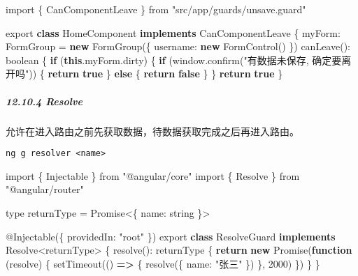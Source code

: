 \documentclass[
]{article}
\newenvironment{Shaded}{}{}
\newcommand{\AttributeTok}[1]{\textcolor[rgb]{0.49,0.56,0.16}{#1}}
\newcommand{\BuiltInTok}[1]{#1}
\newcommand{\ControlFlowTok}[1]{\textcolor[rgb]{0.00,0.44,0.13}{\textbf{#1}}}
\newcommand{\DataTypeTok}[1]{\textcolor[rgb]{0.56,0.13,0.00}{#1}}
\newcommand{\DecValTok}[1]{\textcolor[rgb]{0.25,0.63,0.44}{#1}}
\newcommand{\FunctionTok}[1]{\textcolor[rgb]{0.02,0.16,0.49}{#1}}
\newcommand{\ImportTok}[1]{#1}
\newcommand{\KeywordTok}[1]{\textcolor[rgb]{0.00,0.44,0.13}{\textbf{#1}}}
\newcommand{\NormalTok}[1]{#1}
\newcommand{\OperatorTok}[1]{\textcolor[rgb]{0.40,0.40,0.40}{#1}}
\newcommand{\PreprocessorTok}[1]{\textcolor[rgb]{0.74,0.48,0.00}{#1}}
\newcommand{\StringTok}[1]{\textcolor[rgb]{0.25,0.44,0.63}{#1}}
\begin{document}
\begin{Shaded}
\begin{Highlighting}[]
\ImportTok{import}\NormalTok{ \{ CanComponentLeave \} }\ImportTok{from} \StringTok{"src/app/guards/unsave.guard"}

\ImportTok{export} \KeywordTok{class}\NormalTok{ HomeComponent }\KeywordTok{implements}\NormalTok{ CanComponentLeave \{}
  \DataTypeTok{myForm}\OperatorTok{:}\NormalTok{ FormGroup }\OperatorTok{=} \KeywordTok{new} \FunctionTok{FormGroup}\NormalTok{(\{}
    \DataTypeTok{username}\OperatorTok{:} \KeywordTok{new} \FunctionTok{FormControl}\NormalTok{()}
\NormalTok{  \})}
  \FunctionTok{canLeave}\NormalTok{()}\OperatorTok{:}\NormalTok{ boolean \{}
    \ControlFlowTok{if}\NormalTok{ (}\KeywordTok{this}\OperatorTok{.}\AttributeTok{myForm}\OperatorTok{.}\AttributeTok{dirty}\NormalTok{) \{}
      \ControlFlowTok{if}\NormalTok{ (}\BuiltInTok{window}\OperatorTok{.}\FunctionTok{confirm}\NormalTok{(}\StringTok{"有数据未保存, 确定要离开吗"}\NormalTok{)) \{}
        \ControlFlowTok{return} \KeywordTok{true}
\NormalTok{      \} }\ControlFlowTok{else}\NormalTok{ \{}
        \ControlFlowTok{return} \KeywordTok{false}
\NormalTok{      \}}
\NormalTok{    \}}
    \ControlFlowTok{return} \KeywordTok{true}
\NormalTok{  \}}
\end{Highlighting}
\end{Shaded}

\hypertarget{12104-resolve}{%
\subparagraph{12.10.4 Resolve}\label{12104-resolve}}

允许在进入路由之前先获取数据，待数据获取完成之后再进入路由。

\texttt{ng\ g\ resolver\ \textless{}name\textgreater{}}

\begin{Shaded}
\begin{Highlighting}[]
\ImportTok{import}\NormalTok{ \{ Injectable \} }\ImportTok{from} \StringTok{"@angular/core"}
\ImportTok{import}\NormalTok{ \{ Resolve \} }\ImportTok{from} \StringTok{"@angular/router"}

\NormalTok{type returnType }\OperatorTok{=} \BuiltInTok{Promise}\OperatorTok{\textless{}}\NormalTok{\{ }\DataTypeTok{name}\OperatorTok{:}\NormalTok{ string \}}\OperatorTok{\textgreater{}}

\NormalTok{@}\FunctionTok{Injectable}\NormalTok{(\{}
  \DataTypeTok{providedIn}\OperatorTok{:} \StringTok{"root"}
\NormalTok{\})}
\ImportTok{export} \KeywordTok{class}\NormalTok{ ResolveGuard }\KeywordTok{implements}\NormalTok{ Resolve}\OperatorTok{\textless{}}\NormalTok{returnType}\OperatorTok{\textgreater{}}\NormalTok{ \{}
  \FunctionTok{resolve}\NormalTok{()}\OperatorTok{:}\NormalTok{ returnType \{}
    \ControlFlowTok{return} \KeywordTok{new} \BuiltInTok{Promise}\NormalTok{(}\KeywordTok{function}\NormalTok{ (resolve) \{}
      \PreprocessorTok{setTimeout}\NormalTok{(() }\KeywordTok{=\textgreater{}}\NormalTok{ \{}
        \FunctionTok{resolve}\NormalTok{(\{ }\DataTypeTok{name}\OperatorTok{:} \StringTok{"张三"}\NormalTok{ \})}
\NormalTok{      \}}\OperatorTok{,} \DecValTok{2000}\NormalTok{)}
\NormalTok{    \})}
\NormalTok{  \}}
\NormalTok{\}}
\end{Highlighting}
\end{Shaded}
\end{document}

